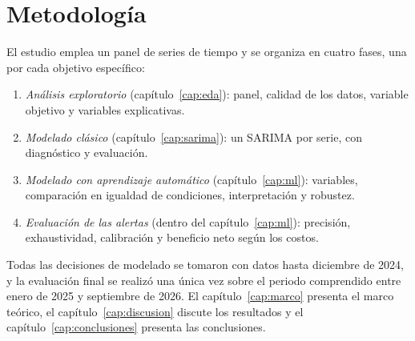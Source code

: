 \section{Metodología}

El estudio emplea un panel de series de tiempo y se organiza en cuatro fases, una por cada objetivo específico:
\begin{enumerate}[nosep]
\item \emph{Análisis exploratorio} (capítulo~\ref{cap:eda}): panel, calidad de los datos, variable objetivo y variables explicativas.
\item \emph{Modelado clásico} (capítulo~\ref{cap:sarima}): un SARIMA por serie, con diagnóstico y evaluación.
\item \emph{Modelado con aprendizaje automático} (capítulo~\ref{cap:ml}): variables, comparación en igualdad de condiciones, interpretación y robustez.
\item \emph{Evaluación de las alertas} (dentro del capítulo~\ref{cap:ml}): precisión, exhaustividad, calibración y beneficio neto según los costos.
\end{enumerate}
Todas las decisiones de modelado se tomaron con datos hasta diciembre de 2024, y la evaluación final se realizó una única vez sobre el periodo comprendido entre enero de 2025 y septiembre de 2026. El capítulo~\ref{cap:marco} presenta el marco teórico, el capítulo~\ref{cap:discusion} discute los resultados y el capítulo~\ref{cap:conclusiones} presenta las conclusiones.

\FloatBarrier
